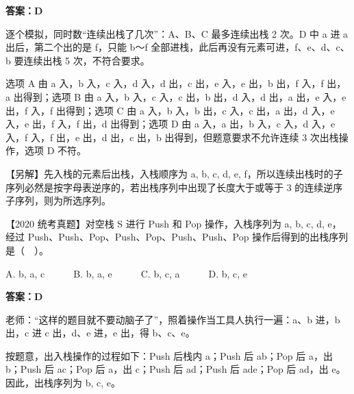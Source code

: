 \documentclass[10.5pt,a4paper,oneside]{article}
\newcommand{\hlred}[1]{\textcolor{wdred}{\bfseries #1}}
\begin{document}
\hlred{\textbf{答案：D}}

\begin{videobox}

逐个模拟，同时数“连续出栈了几次”：A、B、C 最多连续出栈 2 次。D 中 a 进 a
出后，第二个出的是 f，只能 b～f
全部进栈，此后再没有元素可进，f、e、d、c、b 要连续出栈 5
次，不符合要求。

\end{videobox}

\begin{jiexibox}

选项 A 由 a 入，b 入，c 入，d 入，d 出，c 出，e 入，e 出，b 出，f 入，f
出，a 出得到；选项 B 由 a 入，b 入，c 入，c 出，b 出，d 入，d 出，a
出，e 入，e 出，f 入，f 出得到；选项 C 由 a 入，b 入，b 出，c 入，c
出，a 出，d 入，e 入，e 出，f 入，f 出，d 出得到；选项 D 由 a 入，a
出，b 入，c 入，d 入，e 入，f 入，f 出，e 出，d 出，c 出，b
出得到，但题意要求不允许连续 3 次出栈操作，选项 D 不符。

【另解】先入栈的元素后出栈，入栈顺序为 a, b, c, d, e,
f，所以连续出栈时的子序列必然是按字母表逆序的，若出栈序列中出现了长度大于或等于
3 的连续逆序子序列，则为所选序列。

\end{jiexibox}

\begin{questionbox}[30]

【2020 统考真题】对空栈 S 进行 Push 和 Pop 操作，入栈序列为 a, b, c, d,
e，经过 Push、Push、Pop、Push、Pop、Push、Push、Pop
操作后得到的出栈序列是（　）。

A. b, a, c　　　B. b, a, e　　　C. b, c, a　　　D. b, c, e

\end{questionbox}

\hlred{\textbf{答案：D}}

\begin{videobox}

老师：“这样的题目就不要动脑子了”，照着操作当工具人执行一遍：a、b 进，b
出，c 进 c 出，d、e 进，e 出，得 b、c、e。

\end{videobox}

\begin{jiexibox}

按题意，出入栈操作的过程如下：Push 后栈内 a；Push 后 ab；Pop 后 a，出
b；Push 后 ac；Pop 后 a，出 c；Push 后 ad；Push 后 ade；Pop 后 ad，出
e。因此，出栈序列为 b, c, e。

\end{jiexibox}
\end{document}
